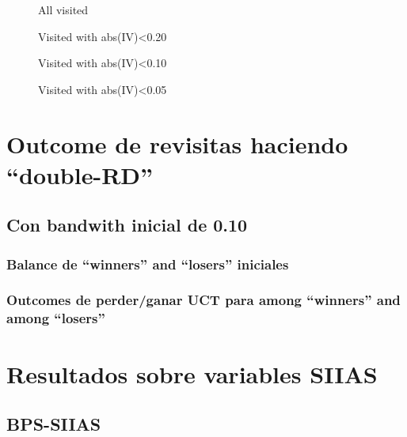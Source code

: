 \documentclass[12pt]{article}
\begin{document}
\begin{figure}[H]
	\caption{All visited}
	
	\centering
	\label{fig:balSinConTusPrimVisitaGlob}
\end{figure}

\begin{figure}[H]
	\caption{Visited with abs(IV)<0.20}
	
	\centering
	\label{fig:balSinConTusPrimVisita020}
\end{figure}

\begin{figure}[H]
	\caption{Visited with abs(IV)<0.10}
	
	\centering
	\label{fig:balSinConTusPrimVisita010}
\end{figure}

\begin{figure}[H]
	\caption{Visited with abs(IV)<0.05}
	
	\centering
	\label{fig:balSinConTusPrimVisita005}
\end{figure}

\section{Outcome de revisitas haciendo ``double-RD''}

\subsection{Con bandwith inicial de 0.10}

\subsubsection{Balance de ``winners'' and ``losers'' iniciales}

\subsubsection{Outcomes de perder/ganar UCT para among ``winners'' and among ``losers''}

\section{Resultados sobre variables SIIAS}

\subsection{BPS-SIIAS}
\end{document}
